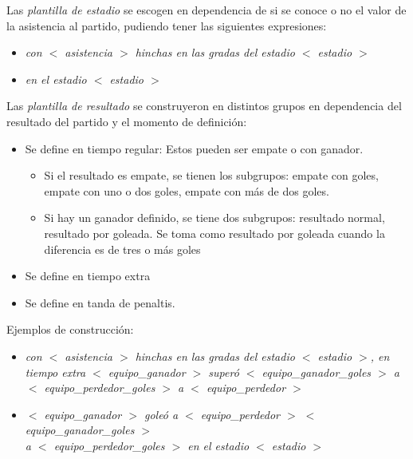 Las \textit{plantilla de estadio} se escogen en dependencia de si se conoce o no el valor de la asistencia al partido, pudiendo tener las siguientes expresiones:
    \begin{itemize}
        \item \textit{con  $<$ asistencia $>$ hinchas en las gradas del estadio $<$ estadio $>$}
        \item \textit{en el estadio $<$ estadio $>$}
    \end{itemize}

Las \textit{plantilla de resultado} se construyeron en distintos grupos en dependencia del resultado del partido y el momento de definición:
    \begin{itemize}
        \item Se define en tiempo regular: Estos pueden ser empate o con ganador. 
                    \begin{itemize}
                        \item Si el resultado es empate, se tienen los subgrupos: empate con goles, 
                        empate con uno o dos goles, empate con más de dos goles. 
                        \item  Si hay un ganador definido, se tiene dos subgrupos: resultado normal, 
                        resultado por goleada. Se toma como resultado por goleada cuando la diferencia es de tres o más goles
                    \end{itemize}
        \item Se define en tiempo extra
        \item Se define en tanda de penaltis.
    \end{itemize}

    Ejemplos de construcción:\\

        \begin{itemize}
           \item  \textit{ con  $<$ asistencia $>$ hinchas en las gradas del estadio $<$ estadio $>$, en tiempo extra $<$ equipo\_ganador $>$ superó $<$ equipo\_ganador\_goles $>$ a \\$<$ equipo\_perdedor\_goles $>$ a $<$ equipo\_perdedor $>$ }
        
            \item  \textit{$<$ equipo\_ganador $>$ goleó a $<$ equipo\_perdedor $>$ $<$ equipo\_ganador\_goles $>$ \\a $<$ equipo\_perdedor\_goles $>$ en el estadio $<$ estadio $>$}
        \end{itemize}



